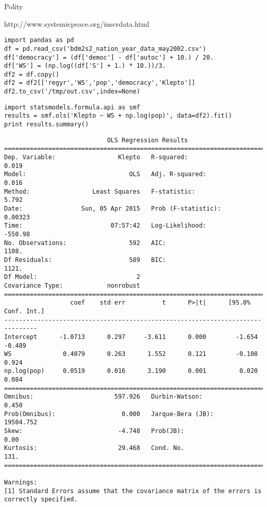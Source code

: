 \documentclass[12pt,fleqn]{article}\usepackage{common}
\begin{document}
Polity

http://www.systemicpeace.org/inscrdata.html

\begin{verbatim}
import pandas as pd
df = pd.read_csv('bdm2s2_nation_year_data_may2002.csv')
df['democracy'] = (df['democ'] - df['autoc'] + 10.) / 20.
df['WS'] = (np.log((df['S'] + 1.) * 10.))/3.
df2 = df.copy()
df2 = df2[['regyr','WS','pop','democracy','Klepto']]
df2.to_csv('/tmp/out.csv',index=None)
\end{verbatim}

\begin{verbatim}
import statsmodels.formula.api as smf
results = smf.ols('Klepto ~ WS + np.log(pop)', data=df2).fit()
print results.summary()
\end{verbatim}

\begin{verbatim}
                            OLS Regression Results                            
==============================================================================
Dep. Variable:                 Klepto   R-squared:                       0.019
Model:                            OLS   Adj. R-squared:                  0.016
Method:                 Least Squares   F-statistic:                     5.792
Date:                Sun, 05 Apr 2015   Prob (F-statistic):            0.00323
Time:                        07:57:42   Log-Likelihood:                -550.98
No. Observations:                 592   AIC:                             1108.
Df Residuals:                     589   BIC:                             1121.
Df Model:                           2                                         
Covariance Type:            nonrobust                                         
===============================================================================
                  coef    std err          t      P>|t|      [95.0% Conf. Int.]
-------------------------------------------------------------------------------
Intercept      -1.0713      0.297     -3.611      0.000        -1.654    -0.489
WS              0.4079      0.263      1.552      0.121        -0.108     0.924
np.log(pop)     0.0519      0.016      3.190      0.001         0.020     0.084
==============================================================================
Omnibus:                      597.926   Durbin-Watson:                   0.450
Prob(Omnibus):                  0.000   Jarque-Bera (JB):            19504.752
Skew:                          -4.748   Prob(JB):                         0.00
Kurtosis:                      29.468   Cond. No.                         131.
==============================================================================

Warnings:
[1] Standard Errors assume that the covariance matrix of the errors is correctly specified.
\end{verbatim}
\end{document}
